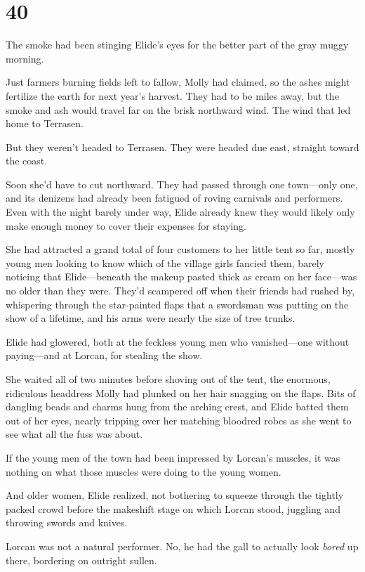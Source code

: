 
\chapter{40}

The smoke had been stinging Elide's eyes for the better part of the gray muggy morning.

Just farmers burning fields left to fallow, Molly had claimed, so the ashes might fertilize the earth for next year's harvest. They had to be miles away, but the smoke and ash would travel far on the brisk northward wind. The wind that led home to Terrasen.

But they weren't headed to Terrasen. They were headed due east, straight toward the coast.

Soon she'd have to cut northward. They had passed through one town---only one, and its denizens had already been fatigued of roving carnivals and performers. Even with the night barely under way, Elide already knew they would likely only make enough money to cover their expenses for staying.

She had attracted a grand total of four customers to her little tent so far, mostly young men looking to know which of the village girls fancied them, barely noticing that Elide---beneath the makeup pasted thick as cream on her face---was no older than they were. They'd scampered off when their friends had rushed by, whispering through the star-painted flaps that a swordsman was putting on the show of a lifetime, and his arms were nearly the size of tree trunks.

Elide had glowered, both at the feckless young men who vanished---one without paying---and at Lorcan, for stealing the show.

She waited all of two minutes before shoving out of the tent, the enormous, ridiculous headdress Molly had plunked on her hair snagging on the flaps. Bits of dangling beads and charms hung from the arching crest, and Elide batted them out of her eyes, nearly tripping over her matching bloodred robes as she went to see what all the fuss was about.

If the young men of the town had been impressed by Lorcan's muscles, it was nothing on what those muscles were doing to the young women.

And older women, Elide realized, not bothering to squeeze through the tightly packed crowd before the makeshift stage on which Lorcan stood, juggling and throwing swords and knives.

Lorcan was not a natural performer. No, he had the gall to actually look
\emph{bored} up there, bordering on outright sullen.

